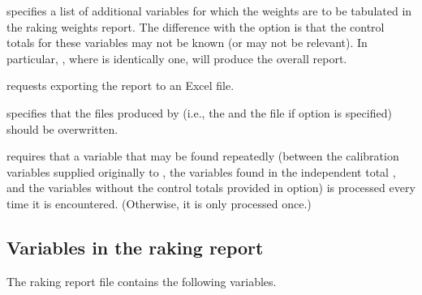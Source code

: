 \hangpara
{} specifies a list of additional variables for which the weights are to
    be tabulated in the raking weights report. The difference with the  option
    is that the control totals for these variables may not be known (or may not be relevant).
    In particular, , where  is identically one, will produce
    the overall report.

\hangpara
{} requests exporting the report to an Excel file.

\hangpara
{} specifies that the files produced by  (i.e., the 
    and the {} file if  option is specified) should be overwritten.

\hangpara
{} requires that a variable that may be found repeatedly (between the calibration variables
    supplied originally to , the variables found in the independent total ,
    and the variables without the control totals provided in  option) is processed every
    time it is encountered. (Otherwise, it is only processed once.)

\subsection{Variables in the raking report}

The raking report file contains the following variables.

